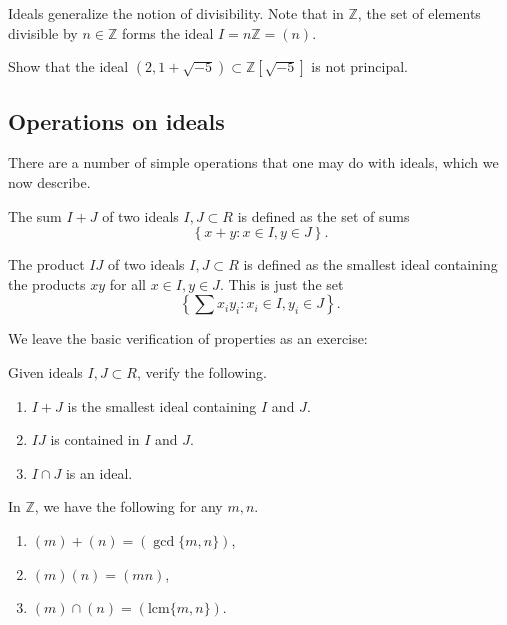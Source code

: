 \begin{example}
Ideals generalize the notion of divisibility.  Note that
in $\mathbb{Z}$, the set of elements divisible by $n \in \mathbb{Z}$ forms the
ideal $I = n\mathbb{Z} = (n)$.
\end{example}

\begin{exercise} 
Show that the ideal $(2, 1 + \sqrt{-5}) \subset \mathbb{Z}[\sqrt{-5}]$ is not
principal.
\end{exercise}

\subsection{Operations on ideals}

There are a number of simple operations that one may do with ideals, which we
now describe.

\begin{definition}
The sum $I + J$ of two ideals $I, J \subset R$ is defined as the set of sums
  \[ \left\{ x + y : x \in I, y \in J \right\}. \]
\end{definition}

\begin{definition}
The product $IJ$ of two ideals $I, J \subset R$ is defined as the smallest
ideal containing the products $xy$ for all $x \in I, y \in J$. This is just
the set
  \[ \left\{ \sum x_i y_i : x_i \in I, y_i \in J \right\}. \]
\end{definition}

We leave the basic verification of properties as an exercise:
\begin{exercise}
Given ideals $I, J \subset R$, verify the following.

\begin{enumerate}
  \item $I + J$ is the smallest ideal containing $I$ and $J$.
  \item  $IJ$ is contained in $I$ and $J$.
  \item $I \cap J$ is an ideal.
\end{enumerate}
\end{exercise}

\begin{example}
In $\mathbb{Z}$, we have the following for any $m, n$.

\begin{enumerate}
  \item $(m) + (n) = (\gcd\{ m, n \})$,
  \item $(m)(n) = (mn)$,
  \item $(m) \cap (n) = (\mathrm{lcm}\{ m, n \})$.
\end{enumerate}
\end{example}

